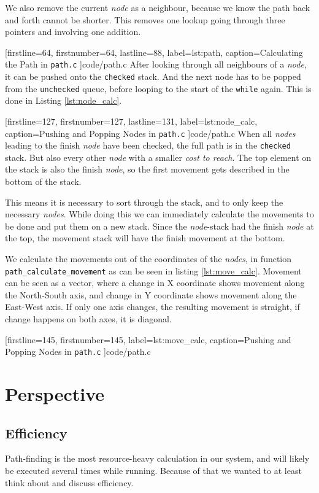 We also remove the current \emph{node} as a neighbour,
because we know the path back and forth cannot be shorter.
This removes one lookup going through three pointers and involving one addition.


[firstline=64,			%
firstnumber=64,
lastline=88,			%
label=lst:path,	%
caption={Calculating the Path in {\tt path.c}}
]{code/path.c}
%
After looking through all neighbours of a \emph{node},
it can be pushed onto the {\tt checked} stack.
And the next node has to be popped from the {\tt unchecked} queue,
before looping to the start of the {\tt while} again.
This is done in Listing \ref{lst:node_calc}.


[firstline=127,			%
firstnumber=127,
lastline=131,			%
label=lst:node_calc,	%
caption={Pushing and Popping Nodes in {\tt path.c}}
]{code/path.c}
%
When all \emph{nodes} leading to the finish \emph{node} have been checked,
the full path is in the {\tt checked} stack.
But also every other \emph{node} with a smaller \emph{cost to reach}.
The top element on the stack is also the finish \emph{node},
so the first movement gets described in the bottom of the stack.

This means it is necessary to sort through the stack,
and to only keep the necessary \emph{nodes}.
While doing this we can immediately calculate the movements to be done
and put them on a new stack.
Since the \emph{node}-stack had the finish \emph{node} at the top,
the movement stack will have the finish movement at the bottom.

We calculate the movements out of the coordinates of the \emph{nodes},
in function {\tt path\_calculate\_movement} as can be seen in listing \ref{lst:move_calc}.
Movement can be seen as a vector,
where a change in X coordinate shows movement along the North-South axis,
and change in Y coordinate shows movement along the East-West axis.
If only one axis changes, the resulting movement is straight,
if change happens on both axes, it is diagonal.


[firstline=145,			%
firstnumber=145,
label=lst:move_calc,	%
caption={Pushing and Popping Nodes in {\tt path.c}}
]{code/path.c}
%
\section{Perspective}
\subsection{Efficiency}
Path-finding is the most resource-heavy calculation in our system,
and will likely be executed several times while running.
Because of that we wanted to at least think about and discuss efficiency.

